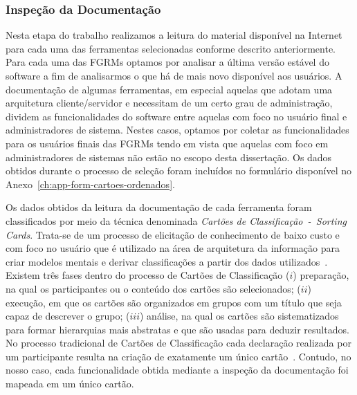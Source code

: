 \subsubsection{Inspeção da Documentação}\label{subsec:inspecao_doumentacao}

Nesta etapa do trabalho realizamos a leitura do material disponível na Internet
para cada uma das ferramentas selecionadas conforme descrito anteriormente.
Para cada uma das FGRMs optamos por analisar a última versão estável do
software a fim de analisarmos o que há de mais novo disponível aos usuários. A
documentação de algumas ferramentas, em especial aquelas que adotam uma
arquitetura cliente/servidor e necessitam de um certo grau de administração,
dividem as funcionalidades do software entre aquelas com foco no usuário final
e ad\-mi\-nis\-tra\-do\-res de sistema. Nestes casos, optamos por coletar as
funcionalidades para os usuários finais das FGRMs tendo em vista que aquelas
com foco em administradores de sistemas não estão no escopo desta dissertação.
Os dados obtidos durante o processo de seleção foram incluídos no formulário
disponível no Anexo~\ref{ch:app-form-cartoes-ordenados}.


Os dados obtidos da leitura da documentação de cada ferramenta foram
classificados por meio da técnica denominada \textit{Cartões de
    Classificação~-~Sorting Cards}. Trata-se de um processo de elicitação de
conhecimento de baixo custo e com foco no usuário que é utilizado na área de
arquitetura da informação para criar modelos mentais e derivar classificações a
partir dos dados utilizados~\cite{just2008towards}. Existem três fases dentro
do processo de Cartões de Classificação ($i$) preparação, na qual os
participantes ou o conteúdo dos cartões são selecionados; ($ii$) execução, em
que os cartões são organizados em grupos com um título que seja capaz de
descrever o grupo; ($iii$) análise, na qual os cartões são sistematizados para
formar hierarquias mais abstratas e que são usadas para deduzir resultados. No
processo tradicional de Cartões de Classificação cada declaração realizada por
um participante resulta na criação de exatamente um único
cartão~\cite{just2008towards}. Contudo, no nosso caso, cada funcionalidade
obtida mediante a inspeção da documentação foi mapeada em um único cartão.


